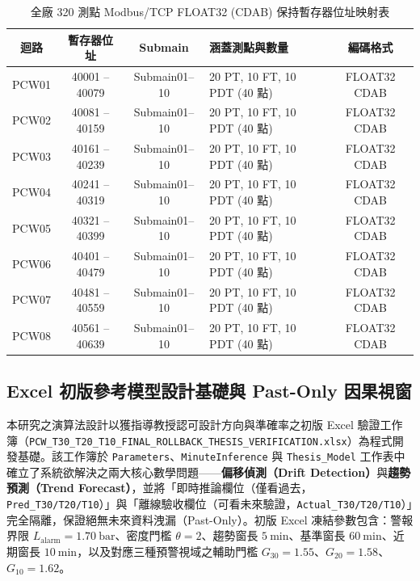 \documentclass[fontset=none, a4paper, 12pt]{ctexart}
\begin{document}
\begin{doublespace}
\begin{table}[H]
\centering
\caption{全廠 320 測點 Modbus/TCP FLOAT32 (CDAB) 保持暫存器位址映射表}
\label{tab:modbus_map_v2}
\footnotesize
\renewcommand{\arraystretch}{1.15}
\setlength{\tabcolsep}{4pt}
\begin{tabularx}{\textwidth}{cccXc}
\toprule
\textbf{迴路} & \textbf{暫存器位址} & \textbf{Submain} & \textbf{涵蓋測點與數量} & \textbf{編碼格式} \\
\midrule
PCW01 & 40001 -- 40079 & Submain01--10 & 20 PT, 10 FT, 10 PDT (40 點) & FLOAT32 CDAB \\
PCW02 & 40081 -- 40159 & Submain01--10 & 20 PT, 10 FT, 10 PDT (40 點) & FLOAT32 CDAB \\
PCW03 & 40161 -- 40239 & Submain01--10 & 20 PT, 10 FT, 10 PDT (40 點) & FLOAT32 CDAB \\
PCW04 & 40241 -- 40319 & Submain01--10 & 20 PT, 10 FT, 10 PDT (40 點) & FLOAT32 CDAB \\
PCW05 & 40321 -- 40399 & Submain01--10 & 20 PT, 10 FT, 10 PDT (40 點) & FLOAT32 CDAB \\
PCW06 & 40401 -- 40479 & Submain01--10 & 20 PT, 10 FT, 10 PDT (40 點) & FLOAT32 CDAB \\
PCW07 & 40481 -- 40559 & Submain01--10 & 20 PT, 10 FT, 10 PDT (40 點) & FLOAT32 CDAB \\
PCW08 & 40561 -- 40639 & Submain01--10 & 20 PT, 10 FT, 10 PDT (40 點) & FLOAT32 CDAB \\
\bottomrule
\end{tabularx}
\end{table}

\subsection{Excel 初版參考模型設計基礎與 Past-Only 因果視窗}
本研究之演算法設計以獲指導教授認可設計方向與準確率之初版 Excel 驗證工作簿（\texttt{PCW\_T30\_T20\_T10\_FINAL\_ROLLBACK\_THESIS\_VERIFICATION.xlsx}）為程式開發基礎。該工作簿於 \texttt{Parameters}、\texttt{MinuteInference} 與 \texttt{Thesis\_Model} 工作表中確立了系統欲解決之兩大核心數學問題——\textbf{偏移偵測（Drift Detection）}與\textbf{趨勢預測（Trend Forecast）}，並將「即時推論欄位（僅看過去，\texttt{Pred\_T30/T20/T10}）」與「離線驗收欄位（可看未來驗證，\texttt{Actual\_T30/T20/T10}）」完全隔離，保證絕無未來資料洩漏（Past-Only）。初版 Excel 凍結參數包含：警報界限 $L_{\mathrm{alarm}} = 1.70\ \mathrm{bar}$、密度門檻 $\theta = 2$、趨勢窗長 $5\ \mathrm{min}$、基準窗長 $60\ \mathrm{min}$、近期窗長 $10\ \mathrm{min}$，以及對應三種預警視域之輔助門檻 $G_{30} = 1.55$、$G_{20} = 1.58$、$G_{10} = 1.62$。


\end{doublespace}
\end{document}
